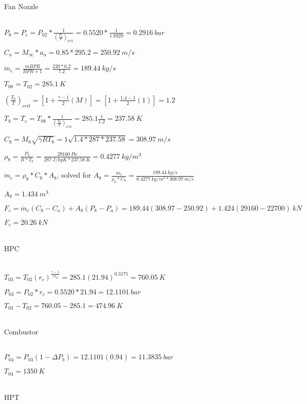 \documentclass{article}
\begin{document}
	\begin{Large}
		Fan Nozzle
	\end{Large}
\\

$P_8=P_c=P_{02}*\frac{1}{(\frac{P_0}{P})_{crit}}=0.5520*\frac{1}{1.8929}=0.2916\ bar$

$C_a=M_{\infty}*a_a=0.85*295.2=250.92\ m/s$

$\dot{m}_c=\frac{\dot{m}BPR}{BPR+1}=\frac{220*6.2}{7.2}=189.44\ kg/s$

$T_{08}=T_{02}=285.1\ K$

$(\frac{T_0}{T})_{crit}=[1+\frac{\gamma-1}{2}(M)]=[1+\frac{1.4-1}{2}(1)]=1.2$

$T_8=T_c=T_{08}*\frac{1}{(\frac{T_0}{T})_{crit}}=285.1\frac{1}{1.2}=237.58\ K$

$C_8=M_8\sqrt{\gamma RT_8}=1\sqrt{1.4*287*237.58}=308.97\ m/s$

$\rho_8=\frac{P_8}{R*T_8}=\frac{29160\ Pa}{287\ J/kgK*237.58\ K}=0.4277\ kg/m^3$

$\dot{m}_c=\rho_8*C_8*A_8$, solved for $A_8=\frac{\dot{m}_c}{\rho_8*C_8}=\frac{189.44\ kg/s}{0.4277\ kg/m^3*308.97\ m/s}$

$A_8=1.434\ m^3$

$F_c=\dot{m}_c(C_8-C_a)+A_8(P_8-P_a)=189.44(308.97-250.92)+1.424(29160-22700)\ kN$

$F_c=20.26\ kN$
\\
\\

	\begin{Large}
		HPC
	\end{Large}
\\

$T_{03}=T_{02}(r_c)^\frac{\gamma-1}{\gamma \eta_{\infty}}=285.1(21.94)^{0.3175}=760.05\ K$

$P_{03}=P_{02}*r_c=0.5520*21.94=12.1101\ bar$

$T_{03}-T_{02}=760.05-285.1=474.96\ K$
\\
\\

	\begin{Large}
		Combustor
	\end{Large}
\\

$P_{04}=P_{03}(1-\Delta P_b)=12.1101(0.94)=11.3835\ bar$

$T_{04}=1350\ K$
\\
\\

	\begin{Large}
		HPT
	\end{Large}
\\
\end{document}

